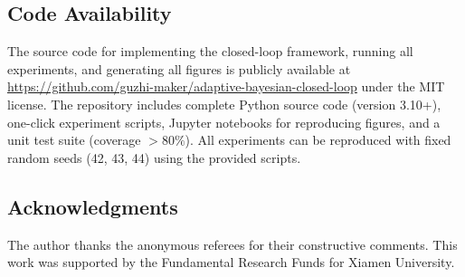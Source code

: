 \documentclass[12pt,a4paper]{article}
\begin{document}
\subsection*{Code Availability}
The source code for implementing the closed-loop framework, running all experiments, and generating all figures is publicly available at \url{https://github.com/guzhi-maker/adaptive-bayesian-closed-loop} under the MIT license. The repository includes complete Python source code (version 3.10+), one-click experiment scripts, Jupyter notebooks for reproducing figures, and a unit test suite (coverage $> 80\%$). All experiments can be reproduced with fixed random seeds (42, 43, 44) using the provided scripts.

\subsection*{Acknowledgments}
The author thanks the anonymous referees for their constructive comments. This work was supported by the Fundamental Research Funds for Xiamen University.



\end{document}
